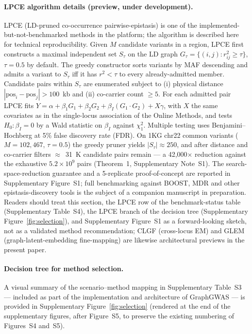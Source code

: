 \paragraph{LPCE algorithm details (preview, under development).}\label{snote:lpce}%
LPCE (LD-pruned co-occurrence pairwise-epistasis) is one of the
implemented-but-not-benchmarked methods in the platform; the
algorithm is described here for technical reproducibility.
Given $M$ candidate variants in a region, LPCE first constructs a
maximal independent set $S_\tau$ on the LD graph
$G_\tau = \{(i,j): r^2_{ij} \geq \tau\}$, $\tau = 0.5$ by default.
The greedy constructor sorts variants by MAF descending and admits
a variant to $S_\tau$ iff it has $r^2 < \tau$ to every
already-admitted member. Candidate pairs within $S_\tau$ are
enumerated subject to (i) physical distance
$|\text{pos}_i - \text{pos}_j| > 100$~kb and (ii) co-carrier count
$\geq 5$. For each admitted pair LPCE fits
$Y = \alpha + \beta_1 G_1 + \beta_2 G_2 + \beta_I (G_1 \cdot G_2) + X\gamma$,
with $X$ the same covariates as in the single-locus association
of the Online Methods, and tests $H_0: \beta_I = 0$ by a Wald
statistic on $\beta_I$ against $\chi^2_1$. Multiple testing uses
Benjamini--Hochberg at 5\% false discovery rate (FDR). On 1KG
chr22 common variants ($M = 102{,}467$, $\tau{=}0.5$) the greedy
pruner yields $|S_\tau| \approx 250$, and after distance and
co-carrier filters $\approx$~31~K candidate pairs remain --- a
42{,}000$\times$ reduction against the exhaustive
$5.2 \times 10^9$ pairs (Theorem~1, Supplementary Note~S1). The
search-space-reduction guarantee and a 5-replicate proof-of-concept
are reported in Supplementary Figure~S1; full benchmarking against
BOOST, MDR and other epistasis-discovery tools is the subject of a
companion manuscript in preparation. Readers should treat this
section, the LPCE row of the benchmark-status table
(Supplementary Table~S4), the LPCE branch of the decision tree
(Supplementary Figure~\ref{fig:selection}), and Supplementary
Figure~S1 as a forward-looking sketch, not as a validated method
recommendation; CLGF (cross-locus EM) and GLEM (graph-latent-embedding
fine-mapping) are likewise architectural previews in the present
paper.

\paragraph{Decision tree for method selection.}
A visual summary of the scenario--method mapping in
Supplementary Table~S3 --- included as part of the implementation
and architecture of GraphGWAS --- is provided in Supplementary
Figure~\ref{fig:selection} (rendered at the end of the
supplementary figures, after Figure~S5, to preserve the existing
numbering of Figures~S4 and~S5).

